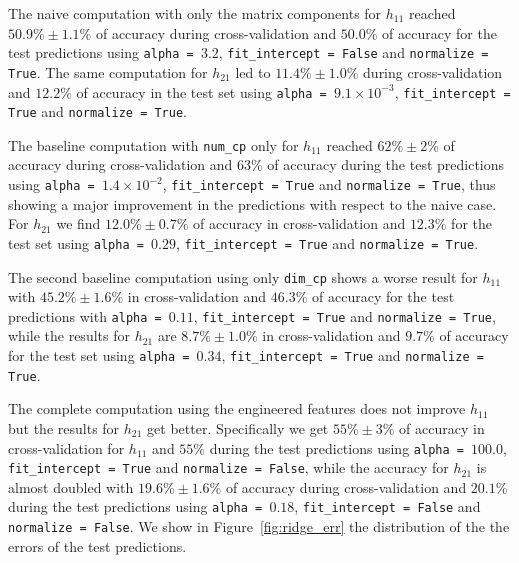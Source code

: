     The naive computation with only the matrix components for $h_{11}$ reached $50.9\% \pm 1.1\%$ of accuracy during cross-validation and $50.0\%$ of accuracy for the test predictions using \texttt{alpha = $3.2$}, \texttt{fit\_intercept = False} and \texttt{normalize = True}. The same computation for $h_{21}$ led to $11.4\% \pm 1.0\%$ during cross-validation and $12.2\%$ of accuracy in the test set using \texttt{alpha = $9.1 \times 10^{-3}$}, \texttt{fit\_intercept = True} and \texttt{normalize = True}.
    
    The baseline computation with \texttt{num\_cp} only for $h_{11}$ reached $62\% \pm 2\%$ of accuracy during cross-validation and $63\%$ of accuracy during the test predictions using \texttt{alpha = $1.4 \times 10^{-2}$}, \texttt{fit\_intercept = True} and \texttt{normalize = True}, thus showing a major improvement in the predictions with respect to the naive case. For $h_{21}$ we find $12.0\% \pm 0.7\%$ of accuracy in cross-validation and $12.3\%$ for the test set using \texttt{alpha = $0.29$}, \texttt{fit\_intercept = True} and \texttt{normalize = True}.
    
    The second baseline computation using only \texttt{dim\_cp} shows a worse result for $h_{11}$ with $45.2\% \pm 1.6\%$ in cross-validation and $46.3\%$ of accuracy for the test predictions with \texttt{alpha = $0.11$}, \texttt{fit\_intercept = True} and \texttt{normalize = True}, while the results for $h_{21}$ are $8.7\% \pm 1.0\%$ in cross-validation and $9.7\%$ of accuracy for the test set using \texttt{alpha = $0.34$}, \texttt{fit\_intercept = True} and \texttt{normalize = True}.
    
    The complete computation using the engineered features does not improve $h_{11}$ but the results for $h_{21}$ get better. Specifically we get $55\% \pm 3\%$ of accuracy in cross-validation for $h_{11}$ and $55\%$ during the test predictions using \texttt{alpha = $100.0$}, \texttt{fit\_intercept = True} and \texttt{normalize = False}, while the accuracy for $h_{21}$ is almost doubled with $19.6\% \pm 1.6\%$ of accuracy during cross-validation and $20.1\%$ during the test predictions using \texttt{alpha = $0.18$}, \texttt{fit\_intercept = False} and \texttt{normalize = False}. We show in Figure~\ref{fig:ridge_err} the distribution of the the errors of the test predictions.
    
